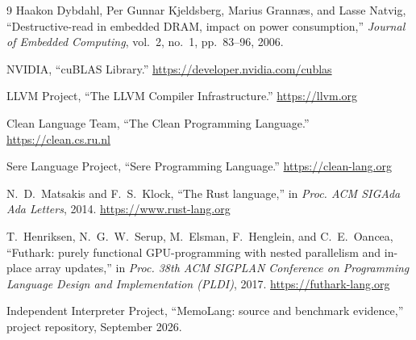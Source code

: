 \documentclass[a4paper]{article}
\begin{document}
\begin{thebibliography}{9}
Haakon Dybdahl, Per Gunnar Kjeldsberg, Marius Grann{\ae}s, and Lasse Natvig,
``Destructive-read in embedded DRAM, impact on power consumption,''
\emph{Journal of Embedded Computing}, vol.~2, no.~1, pp.~83--96, 2006.

NVIDIA, ``cuBLAS Library.'' \url{https://developer.nvidia.com/cublas}

LLVM Project, ``The LLVM Compiler Infrastructure.'' \url{https://llvm.org}

Clean Language Team, ``The Clean Programming Language.'' \url{https://clean.cs.ru.nl}

Sere Language Project, ``Sere Programming Language.'' \url{https://clean-lang.org}

N.~D.~Matsakis and F.~S.~Klock, ``The Rust language,'' in \emph{Proc. ACM SIGAda Ada Letters}, 2014. \url{https://www.rust-lang.org}

T.~Henriksen, N.~G.~W.~Serup, M.~Elsman, F.~Henglein, and C.~E.~Oancea, ``Futhark: purely functional GPU-programming with nested parallelism and in-place array updates,'' in \emph{Proc. 38th ACM SIGPLAN Conference on Programming Language Design and Implementation (PLDI)}, 2017. \url{https://futhark-lang.org}

Independent Interpreter Project, ``MemoLang: source and benchmark evidence,'' project repository, September 2026.

\end{thebibliography}
\end{document}
